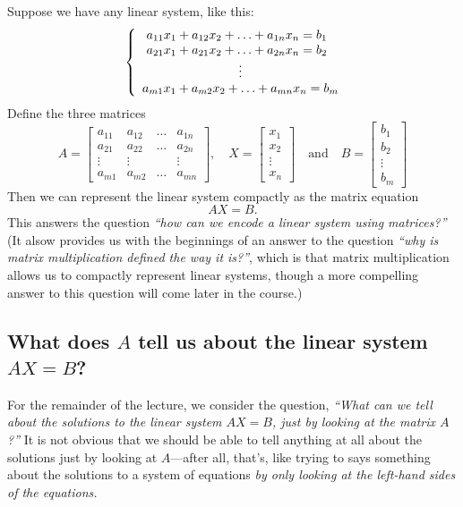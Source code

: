 \documentclass[10pt]{article}
\theoremstyle{definition}
\begin{document}
Suppose we have any linear system, like this:
\begin{equation*}
  \left\{ \begin{array}{l@{}l}
      \ a_{11}x_{1}+a_{12}x_{2}+\ldots+a_{1n}x_{n} = b_{1} \\
      \ a_{21}x_{1}+a_{21}x_{2}+\ldots+a_{2n}x_{n} = b_{2} \\
      \hfill\vdots\hfill \\
      a_{m1}x_{1}+a_{m2}x_{2}+\ldots+a_{mn}x_{n} = b_{m}
    \end{array}\right.
\end{equation*}
Define the three matrices
\begin{equation*}
  A =
  \begin{bmatrix}
    a_{11}&a_{12}&\ldots& a_{1n}\\
    a_{21}&a_{22}&\ldots& a_{2n}\\
    \vdots&\vdots & &\vdots \\
    a_{m1}&a_{m2}&\ldots& a_{mn}
  \end{bmatrix},
  \quad
  X =
  \begin{bmatrix}
    x_{1}\\x_{2}\\\vdots\\x_{n}
  \end{bmatrix}
  \quad \text{and} \quad
  B =
  \begin{bmatrix}
    b_{1}\\b_{2}\\\vdots\\b_{m}
  \end{bmatrix}
\end{equation*}
Then we can represent the linear system compactly as the matrix equation
\begin{equation*}
  AX=B.
\end{equation*}
This answers the question \textit{``how can we encode a linear system using
  matrices?''} (It alsow provides us with the beginnings of an answer to the
question \textit{``why is matrix multiplication defined the way it is?''},
which is that matrix multiplication allows us to compactly represent linear
systems, though a more compelling answer to this question will come later in
the course.)


\subsection{What does $A$ tell us about the linear system $AX=B$? }
For the remainder of the lecture, we consider the question, \textit{``What can
  we tell about the solutions to the linear system $AX=B$, just by looking at
  the matrix $A$?''} It is not obvious that we should be able to tell anything
at all about the solutions just by looking at $A$---after all, that's, like
trying to says something about the solutions to a system of equations
\textit{by only looking at the left-hand sides of the equations.} 
\end{document}
